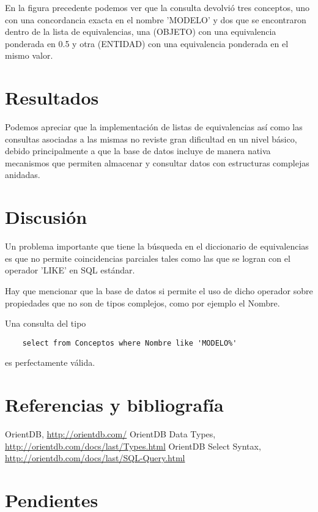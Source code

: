 \documentclass[a4paper,headsepline,footsepline,draft=false]{scrartcl}
\begin{document}
En la figura precedente podemos ver que la consulta devolvió tres conceptos, uno con una concordancia exacta en el nombre 'MODELO' y dos que se encontraron dentro de la lista de equivalencias, una (OBJETO) con una equivalencia ponderada en 0.5 y otra (ENTIDAD) con una equivalencia ponderada en el mismo valor.

\section{Resultados}

Podemos apreciar que la implementación de listas de equivalencias así como las consultas asociadas a las mismas no reviste gran dificultad en un nivel básico, debido principalmente a que la base de datos incluye de manera nativa mecanismos que permiten almacenar y consultar datos con estructuras complejas anidadas.

\section{Discusión}

Un problema importante que tiene la búsqueda en el diccionario de equivalencias es que no permite coincidencias parciales tales como las que se logran con el operador 'LIKE' en SQL estándar.

Hay que mencionar que la base de datos si permite el uso de dicho operador sobre propiedades que no son de tipos complejos, como por ejemplo el Nombre.

Una consulta del tipo

\begin{lstlisting}
	select from Conceptos where Nombre like 'MODELO%'
\end{lstlisting}

es perfectamente válida.

\section{Referencias y bibliografía}

\begin{thebibliography}{50}
		OrientDB, 
		\url{http://orientdb.com/}
		OrientDB Data Types,
		\url{http://orientdb.com/docs/last/Types.html}
		OrientDB Select Syntax,
		\url{http://orientdb.com/docs/last/SQL-Query.html}
\end{thebibliography}

\ifdefined\borrador
\section*{Pendientes}
	\listoftodos[Pendientes]
\fi
\end{document}
